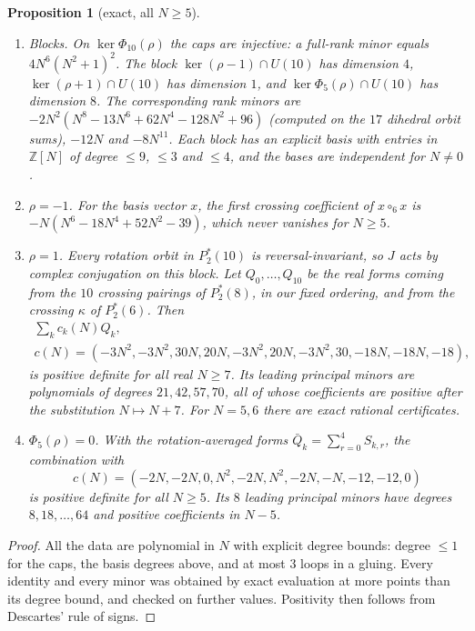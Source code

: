 \documentclass[11pt]{amsart}
\newtheorem{proposition}[theorem]{Proposition}
\theoremstyle{definition}
\theoremstyle{remark}
\theoremstyle{plain}
\numberwithin{equation}{section}
\numberwithin{table}{section}
\newcommand{\Z}{\mathbb Z}
\begin{document}
\begin{proposition}[exact, all $N\ge5$]\label{prop:ten}
\begin{enumerate}
\item \emph{Blocks.} On $\ker\Phi_{10}(\rho)$ the caps are injective: a full-rank minor equals $4N^6(N^2+1)^2$. The block
$\ker(\rho-1)\cap U(10)$ has dimension $4$, $\ker(\rho+1)\cap U(10)$ has dimension $1$, and $\ker\Phi_5(\rho)\cap U(10)$ has dimension $8$.
The corresponding rank minors are $-2N^2(N^8-13N^6+62N^4-128N^2+96)$ (computed on the $17$ dihedral orbit sums), $-12N$ and $-8N^{11}$.
Each block has an explicit basis with entries in $\Z[N]$ of degree $\le9$, $\le3$ and $\le4$, and the bases are independent for $N\ne0$.
\item \emph{$\rho=-1$.} For the basis vector $x$, the first crossing coefficient of $x\circ_6x$ is
$-N(N^6-18N^4+52N^2-39)$, which never vanishes for $N\ge5$.
\item \emph{$\rho=1$.} Every rotation orbit in $P_2^*(10)$ is reversal-invariant, so $J$ acts by complex conjugation on this
block. Let $Q_0,\dots,Q_{10}$ be the real forms coming from the $10$ crossing pairings of $P_2^*(8)$, in our fixed
ordering, and from the crossing $\kappa$ of $P_2^*(6)$. Then
\begin{gather*}
\sum_kc_k(N)Q_k,\\
c(N)=(-3N^2,-3N^2,30N,20N,-3N^2,20N,-3N^2,30,-18N,-18N,-18),
\end{gather*}
is positive definite for all real $N\ge7$. Its leading principal minors are polynomials of degrees $21,42,57,70$, all of
whose coefficients are positive after the substitution $N\mapsto N+7$. For $N=5,6$ there are exact rational certificates.
\item \emph{$\Phi_5(\rho)=0$.} With the rotation-averaged forms $\bar Q_k=\sum_{r=0}^4S_{k,r}$, the combination with
\[
c(N)=(-2N,-2N,0,N^2,-2N,N^2,-2N,-N,-12,-12,0)
\]
is positive definite for all $N\ge5$. Its $8$ leading principal
minors have degrees $8,18,\dots,64$ and positive coefficients in $N-5$.
\end{enumerate}
\end{proposition}

\begin{proof}
All the data are polynomial in $N$ with explicit degree bounds: degree $\le1$ for the caps, the basis degrees above, and
at most $3$ loops in a gluing. Every identity and every minor was obtained by exact evaluation at more points than its
degree bound, and checked on further values. Positivity then follows from Descartes' rule of signs.
\end{proof}
\end{document}
